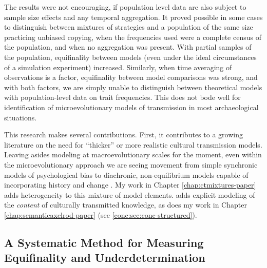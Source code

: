 The results were not encouraging, if population level data are also subject to sample size effects and any temporal aggregation.  It proved possible in some cases to distinguish between mixtures of strategies and a population of the same size practicing unbiased copying, when the frequencies used were a complete census of the population, and when no aggregation was present.  With partial samples of the population, equifinality between models (even under the ideal circumstances of a simulation experiment) increased.  Similarly, when time averaging of observations is a factor, equifinality between model comparisons was strong, and with both factors, we are simply unable to distinguish between theoretical models with population-level data on trait frequencies.  This does not bode well for identification of microevolutionary models of transmission in most archaeological situations.  

This research makes several contributions.  First, it contributes to a growing literature on the need for ``thicker'' or more realistic cultural transmission models.  Leaving asides modeling at macroevolutionary scales for the moment, even within the microevolutionary approach we are seeing movement from simple synchronic models of psychological bias to diachronic, non-equilibrium models capable of incorporating history and change .  My work in Chapter \ref{chap:ctmixtures-paper} adds heterogeneity to this mixture of model elements.  \citet{Tostevin2012,tostevin2019content} adds explicit modeling of the \emph{content} of culturally transmitted knowledge, as does my work in Chapter \ref{chap:semanticaxelrod-paper} (see \ref{conc:sec:conc-structured}). 

\subsection{A Systematic Method for Measuring Equifinality and Underdetermination}\label{conc:sec:equifinality-underdetermination}

